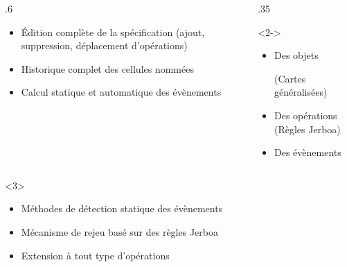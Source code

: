 %
\begin{frame}
	\begin{minipage}[c][.4\textheight][c]{\textwidth}
		\begin{columns}[onlytextwidth]
			\begin{column}{.6\textwidth}
				\begin{myblock}[Objectifs]
					\begin{itemize}
						\item Édition complète de la spécification (ajout,
						      suppression, déplacement d'opérations)
						\item Historique complet des cellules nommées
						\item Calcul statique et automatique des évènements
					\end{itemize}
				\end{myblock}
			\end{column}
			\begin{column}{.35\textwidth}
				\begin{onlyenv}<2->
					\begin{myblock}[Formalisation]
						\begin{itemize}
							\item Des objets \par(Cartes généralisées)
							\item Des opérations (Règles Jerboa)
							\item Des évènements
						\end{itemize}
					\end{myblock}
				\end{onlyenv}
			\end{column}
		\end{columns}
	\end{minipage}
	\begin{minipage}[c][.4\textheight][c]{\textwidth}
		\begin{minipage}{\columnwidth}
			\begin{onlyenv}<3>
				\begin{myblock}[Contributions]
					\begin{itemize}
						\item Méthodes de détection statique des évènements
						\item Mécanisme de rejeu basé sur des règles Jerboa
						\item Extension à tout type d'opérations
					\end{itemize}
				\end{myblock}
			\end{onlyenv}
		\end{minipage}
	\end{minipage}

\end{frame}




